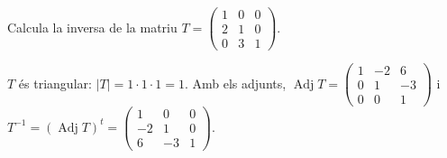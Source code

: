 \begin{apartats}
\begin{nomesllarg}
Calcula la inversa de la matriu $T=\begin{pmatrix}1&0&0\\2&1&0\\0&3&1\end{pmatrix}$.

\begin{solucio}
$T$ és triangular: $|T|=1\cdot1\cdot1=1$. Amb els adjunts,
$\operatorname{Adj}T=\begin{pmatrix}1&-2&6\\0&1&-3\\0&0&1\end{pmatrix}$ i
$T^{-1}=(\operatorname{Adj}T)^t=\begin{pmatrix}1&0&0\\-2&1&0\\6&-3&1\end{pmatrix}$.
\end{solucio}
\end{nomesllarg}

\end{apartats}
